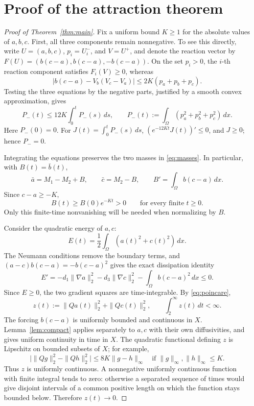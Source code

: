 \documentclass[11pt,a4paper]{article}
\begin{document}
\section{Proof of the attraction theorem}\label{sec:proof}
\begin{proof}[Proof of Theorem~\ref{thm:main}]
Fix a uniform bound \(K\ge1\) for the absolute values of \(a,b,c\).
First, all three components remain nonnegative. To see this directly,
write \(U=(a,b,c)\), \(p_i=U_i^-\), and \(V=U^+\), and denote
the reaction vector by \(F(U)=(b(c-a),b(c-a),-b(c-a))\).
On the set \(p_i>0\), the \(i\)-th reaction component satisfies
\(F_i(V)\ge0\), whereas
\[
 |b(c-a)-V_b(V_c-V_a)|\le2K(p_a+p_b+p_c).
\]
Testing the three equations by the negative parts, justified by a smooth
convex approximation, gives
\[
 P_-(t)\le12K\int_0^tP_-(s)\,ds,\qquad
 P_-(t):=\int_\Omega(p_a^2+p_b^2+p_c^2)\,dx .
\]
Here \(P_-(0)=0\). For \(J(t)=\int_0^tP_-(s)\,ds\),
\((e^{-12Kt}J(t))'\le0\), and \(J\ge0\); hence \(P_-=0\).

Integrating the equations preserves the two masses in
\eqref{eq:masses}. In particular, with \(B(t)=\bar b(t)\),
\begin{equation}\label{eq:means}
 \bar a=M_1-M_2+B,\qquad
 \bar c=M_2-B,\qquad B'=\int_\Omega b(c-a)\,dx .
\end{equation}
Since \(c-a\ge-K\),
\[
 B(t)\ge B(0)e^{-Kt}>0\qquad\text{for every finite }t\ge0 .
\]
Only this finite-time nonvanishing will be needed when normalizing by \(B\).

Consider the quadratic energy of \(a,c\):
\[
 E(t)=\frac12\int_\Omega(a(t)^2+c(t)^2)\,dx.
\]
The Neumann conditions remove the boundary terms, and
\((a-c)b(c-a)=-b(c-a)^2\) gives the exact dissipation identity
\begin{equation}\label{eq:energy}
 E'=-d_1\|\nabla a\|_2^2-d_3\|\nabla c\|_2^2
       -\int_\Omega b(c-a)^2\,dx\le0 .
\end{equation}
Since \(E\ge0\), the two gradient squares are time-integrable.
By \eqref{eq:poincare},
\[
 z(t):=\|Qa(t)\|_2^2+\|Qc(t)\|_2^2,\qquad
 \int_2^\infty z(t)\,dt<\infty .
\]
The forcing \(b(c-a)\) is uniformly bounded and continuous in \(X\).
Lemma~\ref{lem:compact} applies separately to \(a,c\) with their own
diffusivities, and gives uniform continuity in time in \(X\).
The quadratic functional defining \(z\) is Lipschitz on bounded subsets
of \(X\); for example,
\[
 \big|\|Qg\|_2^2-\|Qh\|_2^2\big|
 \le8K\|g-h\|_\infty\quad
 \text{if }\|g\|_\infty,\|h\|_\infty\le K.
\]
Thus \(z\) is uniformly continuous. A nonnegative uniformly continuous
function with finite integral tends to zero: otherwise a separated
sequence of times would give disjoint intervals of a common positive
length on which the function stays bounded below. Therefore \(z(t)\to0\).


\end{proof}
\end{document}

